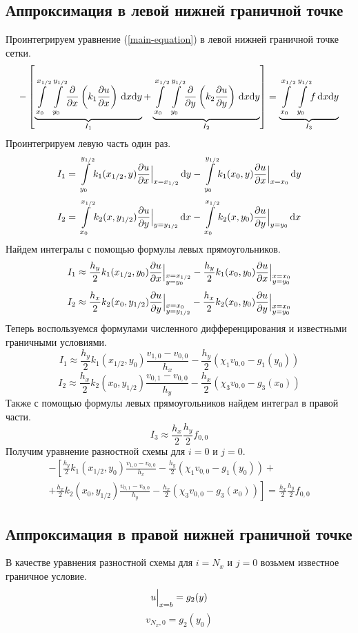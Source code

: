 \subsection{Аппроксимация в левой нижней граничной точке}
Проинтегрируем уравнение (\ref{main-equation}) в левой нижней граничной точке сетки.
\[
  - \left[
  \underbrace{ \int\limits_{x_{0}}^{x_{1/2}}\int\limits_{y_{0}}^{y_{1/2}} \! \pdv{x}\left( k_1 \pdv{u}{x} \right) \, \dd x \dd y }_{I_1} +
  \underbrace{ \int\limits_{x_{0}}^{x_{1/2}}\int\limits_{y_{0}}^{y_{1/2}} \! \pdv{y}\left( k_2 \pdv{u}{y} \right) \, \dd x \dd y }_{I_2}
  \right] =
  \underbrace{ \int\limits_{x_{0}}^{x_{1/2}}\int\limits_{y_{0}}^{y_{1/2}} \! f \, \dd x \dd y }_{I_3}
\]
Проинтегрируем левую часть один раз.
\[ I_1 = \int\limits_{y_{0}}^{y_{1/2}} \! k_1(x_{1/2},y) \pdv{u}{x} \Big\vert_{x = x_{1/2}} \, \dd y - \int\limits_{y_{0}}^{y_{1/2}} \! k_1(x_{0},y) \pdv{u}{x} \Big\vert_{x = x_{0}} \, \dd y \]
\[ I_2 = \int\limits_{x_{0}}^{x_{1/2}} \! k_2(x,y_{1/2}) \pdv{u}{y} \Big\vert_{y = y_{1/2}} \, \dd x - \int\limits_{x_{0}}^{x_{1/2}} \! k_2(x,y_{0}) \pdv{u}{y} \Big\vert_{y = y_{0}} \, \dd x \]
Найдем интегралы с помощью формулы левых прямоугольников.
\[ I_1 \approx \frac{h_y}{2} k_1(x_{1/2},y_{0}) \pdv{u}{x} \Big\vert_{\begin{subarray}{l} x = x_{1/2} \\ y = y_{0} \end{subarray}} - \frac{h_y}{2} k_1(x_{0},y_{0}) \pdv{u}{x} \Big\vert_{\begin{subarray}{l} x = x_{0} \\ y = y_{0} \end{subarray}} \]
\[ I_2 \approx \frac{h_x}{2}  k_2(x_{0},y_{1/2}) \pdv{u}{y} \Big\vert_{\begin{subarray}{l} x = x_{0} \\ y = y_{1/2} \end{subarray}} - \frac{h_x}{2}  k_2(x_{0},y_{0}) \pdv{u}{y} \Big\vert_{\begin{subarray}{l} x = x_{0} \\ y = y_{0} \end{subarray}} \]
Теперь воспользуемся формулами численного дифференцирования и известными граничными условиями.
\[ I_1 \approx \frac{h_y}{2}  k_1(x_{1/2},y_{0}) \frac{v_{1,0} - v_{0,0}}{h_x} - \frac{h_y}{2} \left( \chi_1 v_{0,0} - g_1(y_{0}) \right) \]
\[ I_2 \approx \frac{h_x}{2}  k_2(x_{0},y_{1/2}) \frac{v_{0,1} - v_{0,0}}{h_y} - \frac{h_x}{2} \left( \chi_3 v_{0,0} - g_3(x_{0}) \right) \]
Также с помощью формулы левых прямоугольников найдем интеграл в правой части.
\[ I_3 \approx \frac{h_x}{2} \frac{h_y}{2} f_{0,0} \]
Получим уравнение разностной схемы для $i = 0$ и $j = 0$.
\begin{multline*}
  - \left[
  \frac{h_y}{2}  k_1(x_{1/2},y_{0}) \frac{v_{1,0} - v_{0,0}}{h_x} - \frac{h_y}{2} \left( \chi_1 v_{0,0} - g_1(y_{0}) \right) + \right. \\
  \left. +
  \frac{h_x}{2}  k_2(x_{0},y_{1/2}) \frac{v_{0,1} - v_{0,0}}{h_y} - \frac{h_x}{2} \left( \chi_3 v_{0,0} - g_3(x_{0}) \right)
  \right] =
  \frac{h_x}{2} \frac{h_y}{2} f_{0,0}
\end{multline*}

\subsection{Аппроксимация в правой нижней граничной точке}
В качестве уравнения разностной схемы для $i = N_x$ и $j = 0$ возьмем
известное граничное условие.
\[ u \Big\vert_{x = b} = g_2(y) \]
\[ v_{N_x,0} = g_2(y_0) \]

